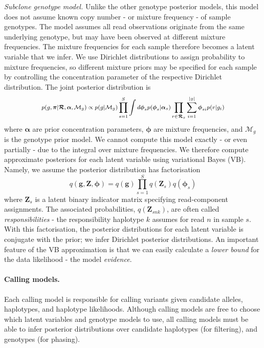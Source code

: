 \documentclass[notitlepage, twocolumn, 10pt]{article}
\begin{document}
\vspace{3mm}
\noindent\emph{Subclone genotype model.} Unlike the other genotype posterior models, this model does not assume known copy number - or mixture frequency - of sample genotypes. The model assumes all read observations originate from the same underlying genotype, but may have been observed at different mixture frequencies. The mixture frequencies for each sample therefore becomes a latent variable that we infer. We use Dirichlet distributions to assign probability to mixture frequencies, so different mixture priors may be specified for each sample by controlling the concentration parameter of the respective Dirichlet distribution. The joint posterior distribution is 
\begin{equation*}
\footnotesize
p(g, \boldsymbol{\pi} | \boldsymbol{\mathcal{R}}, \boldsymbol{\alpha}, \mathcal{M}_g) \propto p(g | \mathcal{M}_g) \prod_{s=1}^S \int d \boldsymbol{\phi}_s p(\boldsymbol{\phi}_s | \boldsymbol{\alpha}_s) \prod_{r \in \boldsymbol{\mathcal{R}}_s} \sum_{i = 1}^{|g|} \boldsymbol{\phi}_{si} p(r | g_i)
\end{equation*}
where $\boldsymbol{\alpha}$ are prior concentration parameters, $\boldsymbol{\phi}$ are mixture frequencies, and $\mathcal{M}_g$ is the genotype prior model. We cannot compute this model exactly - or even partially - due to the integral over mixture frequencies. We therefore compute approximate posteriors for each latent variable using variational Bayes (VB). Namely, we assume the posterior distribution has factorisation
\begin{equation*}
    q(\boldsymbol{g}, \boldsymbol{Z}, \boldsymbol{\phi}) = q(\boldsymbol{g}) \prod_{s = 1}^S q(\boldsymbol{Z}_s) q(\boldsymbol{\phi}_s)
\end{equation*}
where $\boldsymbol{Z}_s$ is a latent binary indicator matrix specifying read-component assignments. The associated probabilities, $q(\boldsymbol{Z}_{snk})$, are often called \emph{responsibilities} - the responsibility haplotype $k$ assumes for read $n$ in sample $s$. With this factorisation, the posterior distributions for each latent variable is conjugate with the prior; we infer Dirichlet posterior distributions. An important feature of the VB approximation is that we can easily calculate a \emph{lower bound} for the data likelihood - the model \emph{evidence}.

\paragraph*{Calling models.} Each calling model is responsible for calling variants given candidate alleles, haplotypes, and haplotype likelihoods. Although calling models are free to choose which latent variables and genotype models to use, all calling models must be able to infer posterior distributions over candidate haplotypes (for filtering), and genotypes (for phasing).
\end{document}
